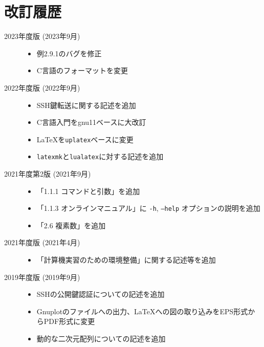 \section*{改訂履歴}

\noindent
\begin{description}
    \item [2023年度版 (2023年9月)] \mbox{}

       \begin{itemize}
           \item 例2.9.1のバグを修正
           \item C言語のフォーマットを変更
       \end{itemize}


    \item [2022年度版 (2022年9月)] \mbox{}

          \begin{itemize}
              \item SSH鍵転送に関する記述を追加
              \item C言語入門をgnu11ベースに大改訂
              \item \LaTeX を\texttt{uplatex}ベースに変更
              \item \texttt{latexmk}と\texttt{lualatex}に対する記述を追加
          \end{itemize}

    \item[2021年度第2版 (2021年9月)] \mbox{}

          \begin{itemize}
              \item 「1.1.1 コマンドと引数」を追加
              \item 「1.1.3 オンラインマニュアル」に \texttt{-h}, \texttt{--help} オプションの説明を追加
              \item 「2.6 複素数」を追加
          \end{itemize}

    \item[2021年度版 (2021年4月)] \mbox{}

          \begin{itemize}
              \item 「計算機実習のための環境整備」に関する記述等を追加
          \end{itemize}

    \item[2019年度版 (2019年9月)] \mbox{}

          \begin{itemize}
              \item SSHの公開鍵認証についての記述を追加
              \item Gnuplotのファイルへの出力、\LaTeX への図の取り込みをEPS形式からPDF形式に変更
              \item 動的な二次元配列についての記述を追加
          \end{itemize}


\end{description}
